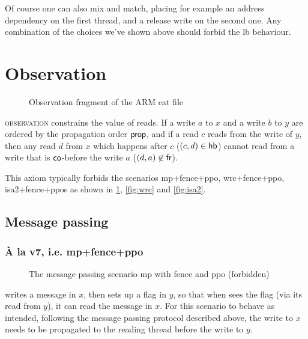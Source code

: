\documentclass[a4paper]{article}
\begin{document}
Of course one can also mix and match, placing for example an address dependency
on the first thread, and a release write on the second one. Any combination of
the choices we've shown above should forbid the {\sf lb} behaviour.

\newpage

\section{Observation \label{sec:observation}}

\begin{figure}[!h]

\vspace*{-4mm}
\caption{Observation fragment of the ARM cat file}
\end{figure}

\textsc{observation} constrains the value of reads.  If a write $a$ to $x$ and
a write $b$ to $y$ are ordered by the propagation order $\operatorname{\mathsf{prop}}$, and if a read
$c$ reads from the write of $y$, then any read $d$ from $x$ which happens after
$c$ (\ie $(c,d) \in \mathsf{hb}$) cannot read from a write that is $\mathsf{co}$-before the
write $a$ (\ie $(d,a) \not\in \mathsf{fr}$).

This axiom typically forbids the scenarios \textsf{mp+fence+ppo,
wrc+fence+ppo, isa2+fence+ppos} as shown in \myfig\ref{fig:mp},
\ref{fig:wrc} and \ref{fig:isa2}.

\subsection{Message passing}

\subsubsection{\`A la v7, i.e. \textsf{mp+fence+ppo}}

\begin{figure}[!h]
\vspace*{-2mm}
\begin{center}
\end{center}
\vspace*{-8mm}
\caption{The message passing scenario \textsf{mp} with fence and
ppo (forbidden) \label{fig:mp}}
\end{figure}

 writes a message in $x$, then sets up a flag in $y$, so that when
 sees the flag (via its read from $y$), it can read the message in $x$.
For this scenario to behave as intended, following the message passing protocol
described above, the write to $x$ needs to be propagated to the reading thread
before the write to $y$.
\end{document}
